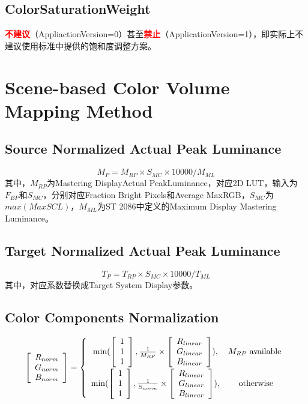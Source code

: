 \documentclass{article}
\begin{document}
\subsection{ColorSaturationWeight}
\textbf{\textcolor{red}{不建议}}（AppliactionVersion=0）甚至\textbf{\textcolor{red}{禁止}}（ApplicationVersion=1），即实际上不建议使用标准中提供的饱和度调整方案。

\section{Scene-based Color Volume Mapping Method}

\subsection{Source Normalized Actual Peak Luminance}
$$M_P = M_{RP} \times S_{MC} \times 10000 / M_{ML}$$
其中，$M_{RP}$为Mastering DisplayActual PeakLuminance，对应2D LUT，输入为$F_{BP}$和$S_{MC}$，分别对应Fraction Bright Pixels和Average MaxRGB，$S_{MC}$为$max(MaxSCL)$，$M_{ML}$为ST 2086中定义的Maximum Display Mastering Luminance。

\subsection{Target Normalized Actual Peak Luminance}
$$T_P = T_{RP} \times S_{MC} \times 10000 / T_{ML}$$
其中，对应系数替换成Target System Display参数。
\subsection{Color Components Normalization}
\begin{equation}
    \left[ \begin{array}{c}
        R_{norm} \\ G_{norm} \\ B_{norm}
    \end{array} \right]
    = \left\{ \begin{array}{cc}
        \min(\left[ \begin{array}{c} 1 \\ 1 \\ 1 \end{array} \right],\frac{1}{M_{RP}}\times \left[ \begin{array}{c} R_{linear} \\ G_{linear} \\ B_{linear} \end{array}\right]), \vspace{0.5ex} & M_{RP} \mbox{ available} \\
        \min(\left[ \begin{array}{c} 1 \\ 1 \\ 1 \end{array} \right],\frac{1}{S_{norm}}\times \left[ \begin{array}{c} R_{linear} \\ G_{linear} \\ B_{linear} \end{array}\right]), & \mbox{ otherwise} 
    \end{array} \right.
\end{equation}
\end{document}
